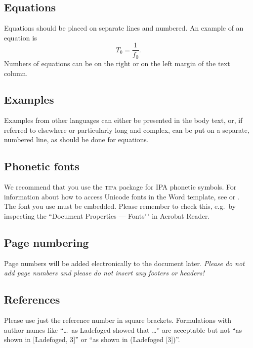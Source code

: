\documentclass[
  a4paper,
  11pt,
  twocolumn]{article}
\begin{document}
\subsection{Equations}

Equations should be placed on separate lines and numbered. An example of
an equation is \begin{equation}\label{eq:tzero}
T_0 = \frac{1}{f_0}.
\end{equation} Numbers of equations can be on the right or on the left
margin of the text column.

\subsection{Examples}

Examples from other languages can either be presented in the body text,
or, if referred to elsewhere or particularly long and complex, can be
put on a separate, numbered line, as should be done for equations.

\subsection{Phonetic fonts}

We recommend that you use the \textsc{tipa} package for IPA phonetic
symbols. For information about how to access Unicode fonts in the Word
template, see \cite{IPA-SIL} or \cite{IPA-KEYBOARD}. The font you use
must be embedded. Please remember to check this, e.g.~by inspecting the
``Document Properties --- Fonts'\,' in Acrobat Reader.

\subsection{Page numbering}

Page numbers will be added electronically to the document later.
\textit{Please do not add page numbers and please do not insert
any footers or headers!}

\subsection{References}

Please use just the reference number in square brackets. Formulations
with author names like ``\ldots~as Ladefoged \cite{Ladefoged:2003}
showed that \ldots'' are acceptable but not ``as shown in {[}Ladefoged,
3{]}'' or ``as shown in (Ladefoged {[}3{]})''.
\end{document}
